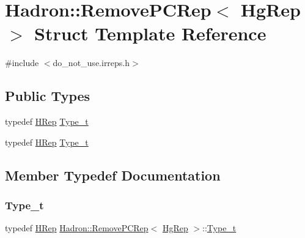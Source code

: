 \hypertarget{structHadron_1_1RemovePCRep_3_01HgRep_01_4}{}\section{Hadron\+:\+:Remove\+P\+C\+Rep$<$ Hg\+Rep $>$ Struct Template Reference}
\label{structHadron_1_1RemovePCRep_3_01HgRep_01_4}


{\ttfamily \#include $<$do\+\_\+not\+\_\+use.\+irreps.\+h$>$}

\subsection*{Public Types}
\begin{DoxyCompactItemize}
\item 
typedef \mbox{\hyperlink{structHadron_1_1HRep}{H\+Rep}} \mbox{\hyperlink{structHadron_1_1RemovePCRep_3_01HgRep_01_4_a85716e0795bf8043fb7f217c9cc34a0e}{Type\+\_\+t}}
\item 
typedef \mbox{\hyperlink{structHadron_1_1HRep}{H\+Rep}} \mbox{\hyperlink{structHadron_1_1RemovePCRep_3_01HgRep_01_4_a85716e0795bf8043fb7f217c9cc34a0e}{Type\+\_\+t}}
\end{DoxyCompactItemize}


\subsection{Member Typedef Documentation}
\mbox{\label{structHadron_1_1RemovePCRep_3_01HgRep_01_4_a85716e0795bf8043fb7f217c9cc34a0e}} 
\subsubsection{\texorpdfstring{Type\_t}{Type\_t}\hspace{0.1cm}{\footnotesize\ttfamily [1/2]}}
{\footnotesize\ttfamily typedef \mbox{\hyperlink{structHadron_1_1HRep}{H\+Rep}} \mbox{\hyperlink{structHadron_1_1RemovePCRep}{Hadron\+::\+Remove\+P\+C\+Rep}}$<$ \mbox{\hyperlink{structHadron_1_1HgRep}{Hg\+Rep}} $>$\+::\mbox{\hyperlink{structHadron_1_1RemovePCRep_3_01HgRep_01_4_a85716e0795bf8043fb7f217c9cc34a0e}{Type\+\_\+t}}}

\mbox{\label{structHadron_1_1RemovePCRep_3_01HgRep_01_4_a85716e0795bf8043fb7f217c9cc34a0e}} 

